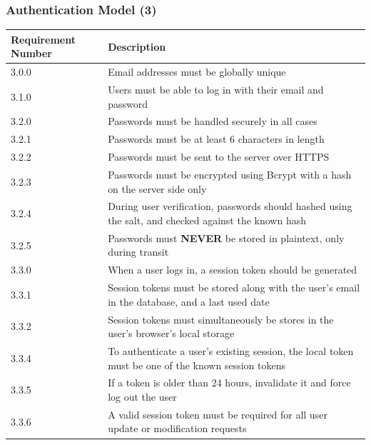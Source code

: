 \documentclass[12pt]{article}
\begin{document}
\subsubsection{Authentication Model (3)}

\setlength{\tabcolsep}{1cm}
\begin{tabular}{|l|p{8cm}|}
    \hline
    Requirement Number & Description                                                                                          \\

    \hline\hline
    3.0.0              & Email addresses must be globally unique                                                              \\

    \hline\hline
    3.1.0              & Users must be able to log in with their email and password                                           \\

    \hline\hline
    3.2.0              & Passwords must be handled securely in all cases                                                      \\
    \hline
    3.2.1              & Passwords must be at least 6 characters in length                                                    \\
    \hline
    3.2.2              & Passwords must be sent to the server over HTTPS                                                      \\
    \hline
    3.2.3              & Passwords must be encrypted using Bcrypt with a hash on the server side only                         \\
    \hline
    3.2.4              & During user verification, passwords should hashed using the salt, and checked against the known hash \\
    \hline
    3.2.5              & Passwords must \textbf{NEVER} be stored in plaintext, only during transit                            \\

    \hline\hline
    3.3.0              & When a user logs in, a session token should be generated                                             \\
    \hline
    3.3.1              & Session tokens must be stored along with the user's email in the database, and a last used date      \\
    \hline
    3.3.2              & Session tokens must simultaneously be stores in the user's browser's local storage                   \\
    \hline
    3.3.4              & To authenticate a user's existing session, the local token must be one of the known session tokens   \\
    \hline
    3.3.5              & If a token is older than 24 hours, invalidate it and force log out the user                          \\
    \hline
    3.3.6              & A valid session token must be required for all user update or modification requests                  \\


\end{tabular}
\end{document}
